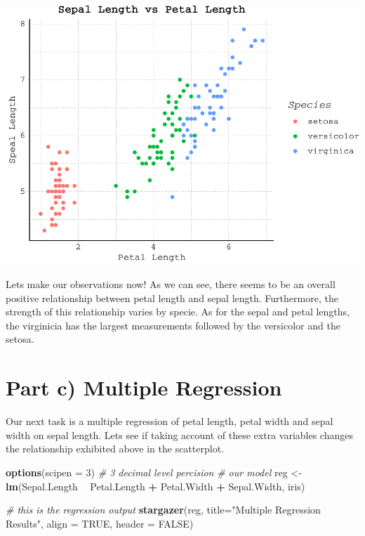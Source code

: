 \documentclass[
]{article}
\newenvironment{Shaded}{\begin{snugshade}}{\end{snugshade}}
\newcommand{\CommentTok}[1]{\textcolor[rgb]{0.56,0.35,0.01}{\textit{#1}}}
\newcommand{\DataTypeTok}[1]{\textcolor[rgb]{0.13,0.29,0.53}{#1}}
\newcommand{\DecValTok}[1]{\textcolor[rgb]{0.00,0.00,0.81}{#1}}
\newcommand{\KeywordTok}[1]{\textcolor[rgb]{0.13,0.29,0.53}{\textbf{#1}}}
\newcommand{\NormalTok}[1]{#1}
\newcommand{\OperatorTok}[1]{\textcolor[rgb]{0.81,0.36,0.00}{\textbf{#1}}}
\newcommand{\OtherTok}[1]{\textcolor[rgb]{0.56,0.35,0.01}{#1}}
\newcommand{\StringTok}[1]{\textcolor[rgb]{0.31,0.60,0.02}{#1}}
\begin{document}
\includegraphics{LR_AIR_Q1_files/figure-latex/unnamed-chunk-5-1.pdf}

Lets make our observations now! As we can see, there seems to be an
overall positive relationship between petal length and sepal length.
Furthermore, the strength of this relationship varies by specie. As for
the sepal and petal lengths, the virginicia has the largest measurements
followed by the versicolor and the setosa.

\newpage

\hypertarget{part-c-multiple-regression}{%
\section{Part c) Multiple Regression}\label{part-c-multiple-regression}}

Our next task is a multiple regression of petal length, petal width and
sepal width on sepal length. Lets see if taking account of these extra
variables changes the relationship exhibited above in the
scatterplot.\newline

\begin{Shaded}
\begin{Highlighting}[]
\KeywordTok{options}\NormalTok{(}\DataTypeTok{scipen =} \DecValTok{3}\NormalTok{) }\CommentTok{# 3 decimal level percision}
\CommentTok{# our model}
\NormalTok{reg <-}\StringTok{ }\KeywordTok{lm}\NormalTok{(Sepal.Length }\OperatorTok{~}\StringTok{ }\NormalTok{Petal.Length }\OperatorTok{+}\StringTok{ }\NormalTok{Petal.Width }\OperatorTok{+}\StringTok{ }\NormalTok{Sepal.Width, iris) }

\CommentTok{# this is the regression output}
\KeywordTok{stargazer}\NormalTok{(reg, }\DataTypeTok{title=}\StringTok{"Multiple Regression Results"}\NormalTok{, }\DataTypeTok{align =} \OtherTok{TRUE}\NormalTok{, }\DataTypeTok{header =} \OtherTok{FALSE}\NormalTok{) }
\end{Highlighting}
\end{Shaded}
\end{document}
